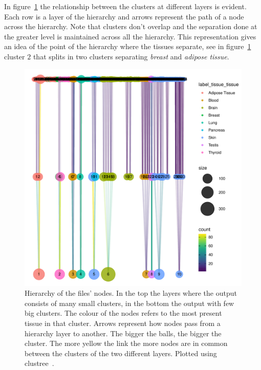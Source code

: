 In figure~\ref{fig:topic/gtex/oversigma_10tissue/bipartite_rebuild} the relationship between the clusters at different layers is evident. Each row is a layer of the hierarchy and arrows represent the path of a node across the hierarchy. Note that clusters don't overlap and the separation done at the greater level is maintained across all the hierarchy. This representation gives an idea of the point of the hierarchy where the tissues separate, see in figure~\ref{fig:topic/gtex/oversigma_10tissue/bipartite_rebuild} cluster $2$ that splits in two clusters separating \textit{breast} and \textit{adipose tissue}.
\begin{figure}[htb!]
    \centering
    \includegraphics[width=0.8\linewidth]{pictures/topic/gtex/oversigma_10tissue/bipartite_rebuild.pdf}
    \caption{Hierarchy of the files' nodes. In the top the layers where the output consists of many small clusters, in the bottom the output with few big clusters. 
    	The colour of the nodes refers to the most present tissue in that cluster.
    	Arrows represent how nodes pass from a hierarchy layer to another. The bigger the balls, the bigger the cluster. The more yellow the link the more nodes are in common between the clusters of the two different layers. Plotted using clustree~\cite{clustree}.}
    \label{fig:topic/gtex/oversigma_10tissue/bipartite_rebuild}
\end{figure}


